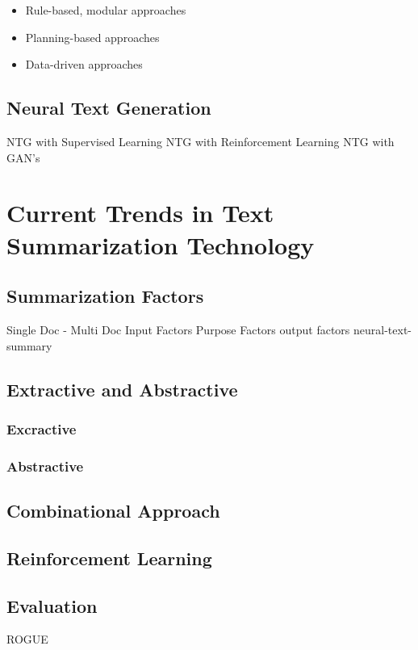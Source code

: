 \begin{itemize}
	\item Rule-based, modular approaches
	\item Planning-based approaches
	\item Data-driven approaches
\end{itemize}


\subsection{Neural Text Generation}
NTG with Supervised Learning
NTG with Reinforcement Learning
NTG with GAN's

\section{Current Trends in Text Summarization Technology}\label{ss:trends}

\subsection{Summarization Factors}
Single Doc - Multi Doc
Input Factors
Purpose Factors
output factors
neural-text-summary

\subsection{Extractive and Abstractive}
\subsubsection{Excractive}

\subsubsection{Abstractive}

\subsection{Combinational Approach}

\subsection{Reinforcement Learning}

\subsection{Evaluation}
ROGUE